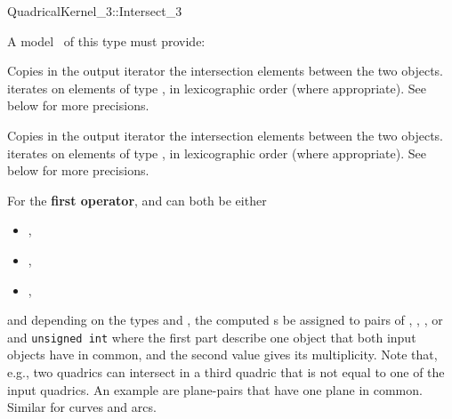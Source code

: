 \begin{ccRefFunctionObjectConcept}{QuadricalKernel_3::Intersect_3}

\ccRefines



A model \ccVar\ of this type must provide:

{Copies in the output iterator the intersection elements between the
two objects.  iterates on
elements of type , in lexicographic order
(where appropriate). See below for more precisions.}

{Copies in the output iterator the intersection elements between the
two objects.  iterates on
elements of type , in lexicographic order 
(where appropriate). See below for more precisions.}

For the \textbf{first operator},  and  can both 
be either

\begin{itemize}
\item {} ,
\item {} ,
\item {} ,
\end{itemize} 

and depending on the types  and , the computed 
s be assigned to pairs of
, , , or 
and {\tt unsigned int} where the first part describe
one object that both input objects have in common, and the second
value gives its multiplicity. Note that, e.g., two quadrics
can intersect in a third quadric that is not equal to one of the input
quadrics. An example are plane-pairs that have one plane in common.
Similar for curves and arcs.

\end{ccRefFunctionObjectConcept}

